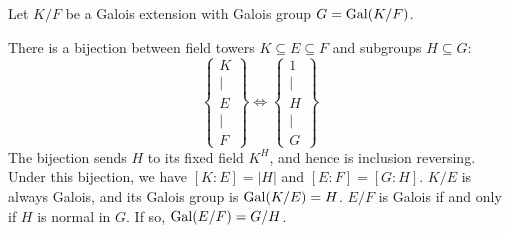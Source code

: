 \begin{theorem}
	Let $K/F$ be a Galois extension with Galois group $G = \operatorname{Gal}(K/F)$.
	\begin{enumerate}[(a)]
	\ii There is a bijection between field towers $K \subseteq E \subseteq F$ and subgroups $H \subseteq G$:
	\[
		\left\{
		\begin{array}{c}
			K \\ \mid \\ E \\ \mid \\ F
		\end{array}
		\right\}
		\iff
		\left\{
		\begin{array}{c}
			1 \\ \mid \\ H \\ \mid \\ G
		\end{array}
		\right\}
	\]
	The bijection sends $H$ to its fixed field $K^H$, and hence is inclusion reversing.
	\ii Under this bijection, we have $[K:E] = \left\lvert H \right\rvert$ and $[E:F] = [G:H]$.
	\ii $K/E$ is always Galois, and its Galois group is $\operatorname{Gal}(K/E) = H$.
	\ii $E/F$ is Galois if and only if $H$ is normal in $G$. If so, $\operatorname{Gal}(E/F) = G/H$.
	\end{enumerate}
\end{theorem}

